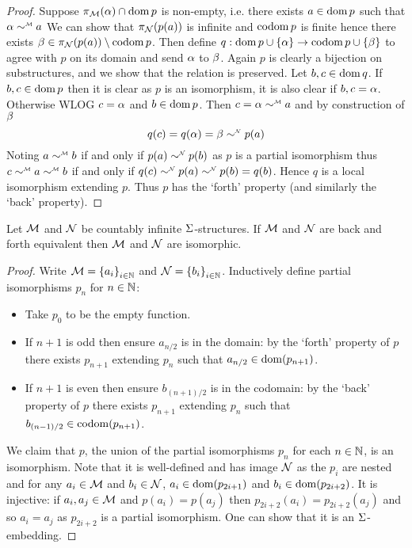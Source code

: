 \begin{proof}
    Suppose $\pi_{\mathcal{M}}(\alpha) \cap \operatorname{dom} p$ is non-empty,
    i.e. there exists $a \in \operatorname{dom} p$ such that $\al \mmintp{\sim} a$
    We can show that 
    $\pi_{\mathcal{N}}(p(a))$ is infinite and $\operatorname{codom} p$ is finite
    hence there exists $\beta \in \pi_{\mathcal{N}}(p(a)) \setminus \operatorname{codom} p$.
    Then define $q : \operatorname{dom} p \cup \left\{\alpha\right\} \to \operatorname{codom} p \cup \left\{\beta\right\}$
    to agree with $p$ on its domain and send $\alpha$ to $\beta$.
    Again $p$ is clearly a bijection on substructures, 
    and we show that the relation is preserved.
    Let $b,c \in \operatorname{dom} q$. 
    If $b,c \in \operatorname{dom} p$ then it is clear as $p$ is an isomorphism,
    it is also clear if $b,c = \alpha$.
    Otherwise WLOG $c = \alpha$ and $b \in \operatorname{dom} p$.
    Then $c = \al \mmintp{\sim} a$ and
    by construction of $\beta$ 
    \[q(c) = q(\al) = \be \nnintp{\sim} p(a)\]
    Noting $a \mmintp{\sim} b$ if and only if $p(a) \nnintp{\sim} p(b)$
    as $p$ is a partial isomorphism
    thus $c \mmintp{\sim} a \mmintp{\sim} b$ 
    if and only if $q(c) \nnintp{\sim} p(a) \nnintp{\sim} p(b) = q(b)$.
    Hence $q$ is a local isomorphism extending $p$.
    Thus $p$ has the `forth' property (and similarly the `back' property).
\end{proof} 

\begin{prop}
    Let $\mathcal{M}$ and $\mathcal{N}$ be countably infinite $\Sigma$-structures.
    If $\mathcal{M}$ and $\mathcal{N}$ are back and forth equivalent then 
    $\mathcal{M}$ and $\mathcal{N}$ are isomorphic. 
\end{prop}
\begin{proof}
    Write $\mathcal{M} = \left\{a_i\right\}_{i \in \mathbb{N}}$ and $\mathcal{N} = \left\{b_i\right\}_{i \in \mathbb{N}}$.
    Inductively define partial isomorphisms $p_n$ for $n \in \mathbb{N}$:
    \begin{itemize}
        \item Take $p_0$ to be the empty function.
        \item If $n + 1$ is odd then ensure $a_{n/2}$ 
            is in the domain:
            by the `forth' property of $p$ there exists $p_{n+1}$ 
            extending $p_n$ such that $a_{n/2} \in \operatorname{dom}(p_{n+1})$.
        \item If $n + 1$ is even then ensure $b_{(n+1)/2}$ is in the codomain:
            by the `back' property of $p$ there exists $p_{n+1}$ 
            extending $p_n$ such that $b_{(n-1)/2} \in \operatorname{codom}(p_{n+1})$.
    \end{itemize}
    We claim that $p$, the union of the partial isomorphisms 
    $p_n$ for each $n \in \mathbb{N}$, is an isomorphism.
    Note that it is well-defined and has image $\mathcal{N}$ as the $p_i$ are nested and
    for any $a_i \in \mathcal{M}$ and $b_i \in \mathcal{N}$, 
    $a_i \in \operatorname{dom}(p_{2i+1})$ and $b_i \in \operatorname{dom}(p_{2i+2})$.
    It is injective: if $a_i, a_j \in \mathcal{M}$ and $p(a_i) = p(a_j)$ then 
    $p_{2i+2}(a_i) = p_{2i+2}(a_j)$ and so $a_i = a_j$ as $p_{2i+2}$ is a 
    partial isomorphism.
    One can show that it is an $\Sigma$-embedding.
\end{proof}

